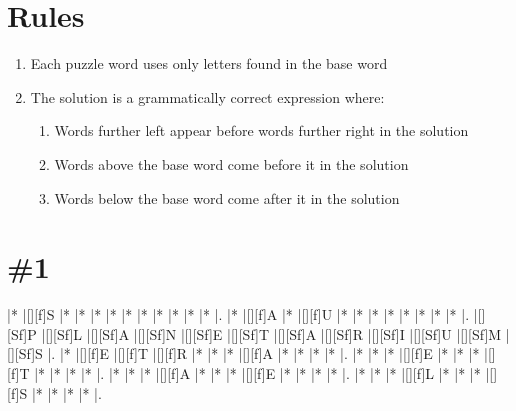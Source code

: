 \documentclass[letterpaper]{article}
\begin{document}
\section*{Rules}

\begin{enumerate}
    \item Each puzzle word uses only letters found in the base word
    \item The solution is a grammatically correct expression where:
    \begin{enumerate}
        \item Words further left appear before words further right in the solution
        \item Words above the base word come before it in the solution
        \item Words below the base word come after it in the solution
    \end{enumerate}
\end{enumerate}

\section*{\#1}
\begin{Puzzle}{12}{8}
|*        |[][f]S   |*        |*        |*        |*        |*        |*        |*        |*        |*        |*        |.
|*        |[][f]A   |*        |[][f]U   |*        |*        |*        |*        |*        |*        |*        |*        |.
|[][Sf]P  |[][Sf]L  |[][Sf]A  |[][Sf]N  |[][Sf]E  |[][Sf]T  |[][Sf]A  |[][Sf]R  |[][Sf]I  |[][Sf]U  |[][Sf]M  |[][Sf]S  |.
|*        |[][f]E   |[][f]T   |[][f]R   |*        |*        |*        |[][f]A   |*        |*        |*        |*        |.
|*        |*        |*        |[][f]E   |*        |*        |*        |[][f]T   |*        |*        |*        |*        |.
|*        |*        |*        |[][f]A   |*        |*        |*        |[][f]E   |*        |*        |*        |*        |.
|*        |*        |*        |[][f]L   |*        |*        |*        |[][f]S   |*        |*        |*        |*        |.
\end{Puzzle}
\end{document}
